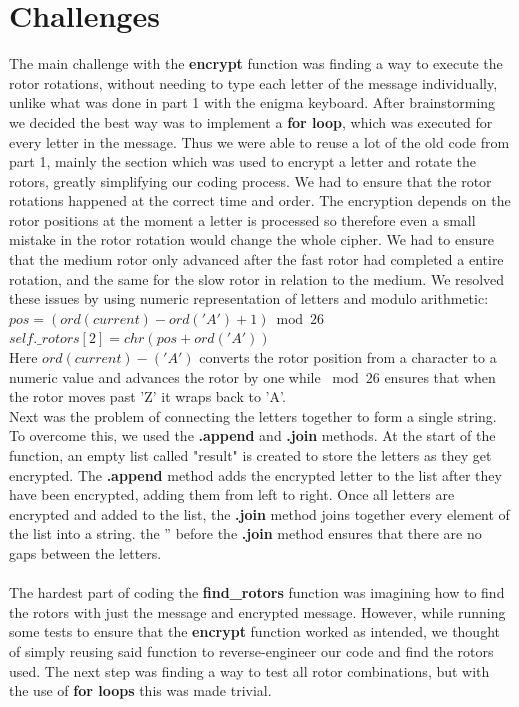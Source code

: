 \documentclass[12pt]{article}
\begin{document}
\section{Challenges}
The main challenge with the \textbf{encrypt} function was finding a way to execute the rotor rotations, without needing to type each letter of the message individually, unlike what was done in part 1 with the enigma keyboard. After brainstorming we decided the best way was to implement a \textbf{for loop}, which was executed for every letter in the message. Thus we were able to reuse a lot of the old code from part 1, mainly the section which was used to encrypt a letter and rotate the rotors, greatly simplifying our coding process. We had to ensure that the rotor rotations happened at the correct time and order. The encryption depends on the rotor positions at the moment a letter is processed so therefore even a small mistake in the rotor rotation would change the whole cipher. We had to ensure that the medium rotor only advanced after the fast rotor had completed a entire rotation, and the same for the slow rotor in relation to the medium. We resolved these issues by using numeric representation of letters and modulo arithmetic: \\ $pos = (ord(current) - ord('A') + 1)\bmod 26$ \\ 
$self.\_rotors[2] = chr(pos + ord('A'))$\\
Here $ord(current)-('A')$ converts the rotor position from a character to a numeric value and advances the rotor by one while $\bmod 26$ ensures that when the rotor moves past 'Z' it wraps back to 'A'.
\\
Next was the problem of connecting the letters together to form a single string. To overcome this, we used the \textbf{.append} and \textbf{.join} methods. At the start of the function, an empty list called "result" is created to store the letters as they get encrypted. The \textbf{.append} method adds the encrypted letter to the list after they have been encrypted, adding them from left to right. Once all letters are encrypted and added to the list, the \textbf{.join} method joins together every element of the list into a string. the '' before the \textbf{.join} method ensures that there are no gaps between the letters.\\
\\
The hardest part of coding the \textbf{find\_rotors} function was imagining how to find the rotors with just the message and encrypted message. However, while running some tests to ensure that the \textbf{encrypt} function worked as intended, we thought of simply reusing said function to reverse-engineer our code and find the rotors used. The next step was finding a way to test all rotor combinations, but with the use of \textbf{for loops} this was made trivial.\\
\end{document}
